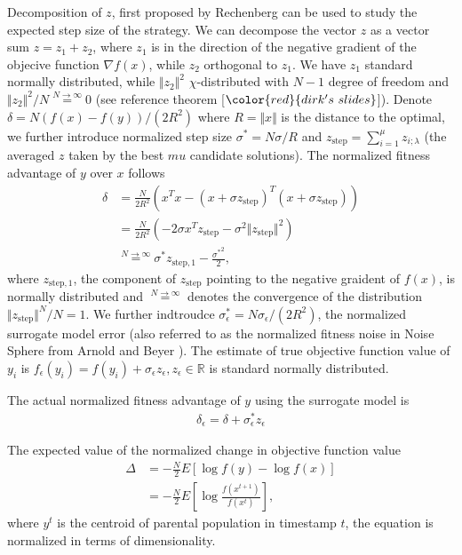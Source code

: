 Decomposition of $z$, first proposed by Rechenberg \cite{rechenberg1973evolutionsstrategie} can be used to study the expected step size of the strategy. We can decompose the vector $z$ as a vector sum $z = z_1 + z_2$, where $z_1$ is in the direction of the negative gradient of the objecive function $\nabla f(x)$, while $z_2$ orthogonal to $z_1$. We have $z_1$ standard normally distributed, while $\Vert z_2\Vert^2$ $\chi$-distributed with $N-1$ degree of freedom and $ \Vert z_2\Vert^2 /N \overset{N \rightarrow \infty }{=} 0$ (see reference theorem [$\color{red}{dirk's\ slides }$]). Denote $\delta = N (f(x) - f(y))/(2R^2)$ where $R = \Vert x \Vert$ is the distance to the optimal, we further introduce normalized step size $\sigma^* = N \sigma/R$ and $z_{\text{step}} = \sum_{i=1}^\mu z_{i;\lambda}$ (the averaged $z$ taken by the best $mu$ candidate solutions). The normalized fitness advantage of $y$ over $x$ follows
\begin{align}
\delta & = \frac{N}{2R^2} (x^Tx - (x+\sigma z_{\text{step}})^T (x+\sigma z_{\text{step}})) \nonumber\\
& = \frac{N}{2R^2} (-2 \sigma x^Tz_{\text{step}} - \sigma^2 \Vert z_{\text{step}}\Vert^2 ) \nonumber\\
& \overset{N \rightarrow \infty}{=} \sigma^* z_{\text{step},1} - \frac{{\sigma^*} ^2}{2},
\end{align}
where $z_{\text{step},1} $, the component of $z_{\text{step}}$ pointing to the negative graident of $f(x)$, is normally distributed and $\overset{ N \rightarrow \infty}{=}$ denotes the convergence of the distribution $\Vert z_{\text{step} } \Vert^N/N = 1$. We further indtroudce $\sigma_\epsilon^* = N \sigma_\epsilon / (2R^2)$, the normalized surrogate model error (also referred to as the normalized fitness noise in Noise Sphere from Arnold and Beyer \cite{1284729}). The estimate of true objective function value of $y_i$ is $f_\epsilon (y_i) = f(y_i) + \sigma_\epsilon z_\epsilon, z_\epsilon \in \mathbb{R}$ is standard normally distributed.

The actual normalized fitness advantage of $y$ using the surrogate model is 
\begin{align}
\delta_\epsilon = \delta+\sigma_\epsilon^* z_\epsilon 
\end{align}

The expected value of the normalized change in objective function value  
\begin{align}
\Delta &= -\frac{N}{2} E \left [  \log f(y) - \log {f(x)} \right ] \nonumber\\
 &= -\frac{N}{2} E \left [  \log \frac{f(x^{t+1})}{f(x^{t})} \right ], 
\end{align}
where $y^{t}$ is the centroid of parental population in timestamp $t$, the equation is normalized in terms of dimensionality.

